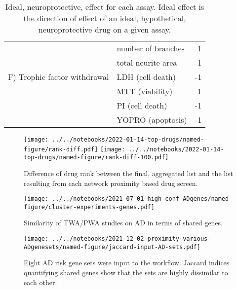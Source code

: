\documentclass[letterpaper]{article}
\begin{document}
\begin{table}[p]
\begin{tabular}{llr}
                              & number of branches &                                                  1 \\
                              & total neurite area &                                                  1 \\
F)  Trophic factor withdrawal & LDH (cell death) &                                                 -1 \\
                              & MTT (viability) &                                                  1 \\
                              & PI (cell death) &                                                 -1 \\
                              & YOPRO (apoptosis) &                                                 -1 \\
\bottomrule
\end{tabular}
\caption{
  Ideal, neuroprotective, effect for each assay.  Ideal effect is the
  direction of effect of an ideal, hypothetical, neuroprotective drug on a
  given assay.
}
\label{tab:protect-sign}
\end{table}

\begin{figure}[p]
\texttt{[image: ../../notebooks/2022-01-14-top-drugs/named-figure/rank-diff.pdf]}
\texttt{[image: ../../notebooks/2022-01-14-top-drugs/named-figure/rank-diff-100.pdf]}
\caption{
Difference of drug rank between the final, aggregated list and the list
resulting from each network proximity based drug screen.
}
\label{fig:rank-diff}
\end{figure}


\begin{figure}
\texttt{[image: ../../notebooks/2021-07-01-high-conf-ADgenes/named-figure/cluster-experiments-genes.pdf]}
\caption{
Similarity of TWA/PWA studies on AD in terms of shared genes.
}
\label{fig:twas-clustermap}
\end{figure}


\begin{figure}[p]
\texttt{[image: ../../notebooks/2021-12-02-proximity-various-ADgenesets/named-figure/jaccard-input-AD-sets.pdf]}
\caption{
Eight AD risk gene sets were input to the workflow.
  Jaccard indices quantifying shared genes show that the sets are highly
  dissimilar to each other.
}
\label{fig:gset-jaccard}
\end{figure}
\end{document}
